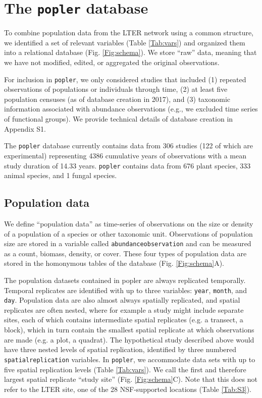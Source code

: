 \documentclass{article}\usepackage[]{graphicx}\usepackage[]{color}
\begin{document}
\section*{The \texttt{popler} database}
To combine population data from the LTER network using a common structure, we identified a set of relevant variables (Table \ref{Tab:vars}) and organized them into a relational database (Fig. \ref{Fig:schema}). We store ``raw'' data, meaning that we have not modified, edited, or aggregated the original observations. 

For inclusion in \texttt{popler}, we only considered studies that included (1) repeated observations of populations or individuals through time, (2) at least five population censuses (as of database creation in 2017), and (3) taxonomic information associated with abundance observations (e.g., we excluded time series of functional groups). We provide technical details of database creation in Appendix S1.


The \texttt{popler} database currently contains data from 306 studies (122 of which are experimental) representing 4386 cumulative years of observations with a mean study duration of 14.33 years. \texttt{popler} contains data from 676 plant species, 333 animal species, and 1 fungal species.

\subsection*{Population data}
We define ``population data'' as time-series of observations on the size or density of a population of a species or other taxonomic unit. Observations of population size are stored in a variable called \texttt{abundance\textunderscore observation} and can be measured as a count, biomass, density, or cover. These four types of population data are stored in the homonymous tables of the database (Fig. \ref{Fig:schema}A).

The population datasets contained in popler are always replicated temporally. Temporal replicates are identified with up to three variables: \texttt{year}, \texttt{month}, and \texttt{day}. Population data are also almost always spatially replicated, and spatial replicates are often nested, where for example a study might include separate sites, each of which contains intermediate spatial replicates (e.g. a transect, a block), which in turn contain the smallest spatial replicate at which observations are made (e.g. a plot, a quadrat). The hypothetical study described above would have three nested levels of spatial replication, identified by three numbered \texttt{spatial\textunderscore replication} variables. In \texttt{popler}, we accommodate data sets with up to five spatial replication levels (Table \ref{Tab:vars}). We call the first and therefore largest spatial replicate ``study site'' (Fig. \ref{Fig:schema}C). Note that this does not refer to the LTER site, one of the 28 NSF-supported locations (Table \ref{Tab:S3}).
\end{document}
